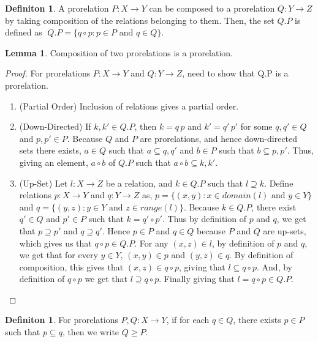 \documentclass[18pt,a4paper]{article}
\theoremstyle{definition}
\newtheorem{definition}[theorem]{Definiton}
\newtheorem{lemma}[theorem]{Lemma}
\begin{document}
		\begin{definition}%
			A prorelation $P:X \to Y$ can be composed to a prorelation $Q:Y \to Z$ by taking
			composition of the relations belonging to them. Then, the set $Q.P$ is defined as
			$\; Q.P=\{q \circ p : p \in P \text{ and } q \in Q  \}$.
		\end{definition}
		\begin{lemma}
			Composition of two prorelations is a prorelation.
		\end{lemma}
		\begin{proof}\setcounter{equation}{0}

			For prorelations $P:X \to Y$ and $Q:Y \to Z$, need to show that Q.P is a prorelation.
			\begin{enumerate}[label=(\roman*)]
				\item (Partial Order) Inclusion of relations gives a partial order.
				\item (Down-Directed) If $k,k' \in Q.P$, then $k=q\,p$ and $k'=q'\,p'$ for some
					$q,q' \in Q$ and $p,p' \in P$. Because $Q$ and $P$ are prorelations,
					and hence down-directed sets there exists, $a \in Q$ such that
					$ a\subseteq q,q'$ and $b \in P$ such that $b \subseteq p,p'$. Thus,
					giving an element, $a\circ b$ of $Q.P$ such that $a \circ b \subseteq k, k'$.
				\item (Up-Set) Let $l:X \to Z$ be a relation, and $k \in Q.P$ such that $l \supseteq k$.
					Define relations $ p:X \to Y $ and $q:Y \to Z$ as,
					$p=\{(x,y): x \in domain(l) \text{ and } y \in Y\}$ and
					$q=\{(y,z):  y \in Y \text{ and } z \in range(l)\}$.
					Because $k\in Q.P$, there exist $q'\in Q$ and $p' \in P$ such that
					$k = q' \circ p'$. Thus by definition of $p$ and $q$, we get that
					$p \supseteq p'$ and $q \supseteq q'$. Hence $p \in P$ and $q \in Q$ because
					$P$ and $Q$ are up-sets, which gives us that $q\circ p \in Q.P$.
					For any $(x,z) \in l$, by definition
					of $p$ and $q$, we get that for every $y \in Y$, $(x,y) \in p$ and
					$(y,z) \in q $. By
					definition of composition, this gives that $(x,z) \in q \circ p$,
					giving that $l \subseteq q \circ p$. And, by definition
					of $q \circ p$ we get that $l \supseteq q \circ p$. Finally giving that
					$l=q \circ p \in Q.P$. \qedhere
			\end{enumerate}
		\end{proof}
		\begin{definition} %

			For prorelations $P,Q:X\to Y$, if for each $q \in Q$, there exists $p \in P$ such that
			$p \subseteq q$, then we write $Q\geq P$.
		\end{definition}
\end{document}
